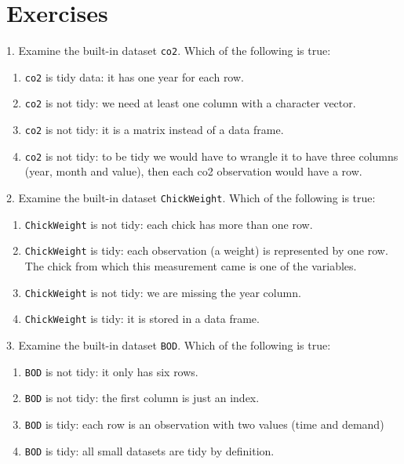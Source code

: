 \documentclass[
]{krantz}
\providecommand{\tightlist}{%
  \setlength{\itemsep}{0pt}\setlength{\parskip}{0pt}}
\begin{document}
\hypertarget{exercises-8}{%
\section{Exercises}\label{exercises-8}}

1. Examine the built-in dataset \texttt{co2}. Which of the following is true:

\begin{enumerate}
\def\labelenumi{\alph{enumi}.}
\tightlist
\item
  \texttt{co2} is tidy data: it has one year for each row.
\item
  \texttt{co2} is not tidy: we need at least one column with a character vector.
\item
  \texttt{co2} is not tidy: it is a matrix instead of a data frame.
\item
  \texttt{co2} is not tidy: to be tidy we would have to wrangle it to have three columns (year, month and value), then each co2 observation would have a row.
\end{enumerate}

2. Examine the built-in dataset \texttt{ChickWeight}. Which of the following is true:

\begin{enumerate}
\def\labelenumi{\alph{enumi}.}
\tightlist
\item
  \texttt{ChickWeight} is not tidy: each chick has more than one row.
\item
  \texttt{ChickWeight} is tidy: each observation (a weight) is represented by one row. The chick from which this measurement came is one of the variables.
\item
  \texttt{ChickWeight} is not tidy: we are missing the year column.
\item
  \texttt{ChickWeight} is tidy: it is stored in a data frame.
\end{enumerate}

3. Examine the built-in dataset \texttt{BOD}. Which of the following is true:

\begin{enumerate}
\def\labelenumi{\alph{enumi}.}
\tightlist
\item
  \texttt{BOD} is not tidy: it only has six rows.
\item
  \texttt{BOD} is not tidy: the first column is just an index.
\item
  \texttt{BOD} is tidy: each row is an observation with two values (time and demand)
\item
  \texttt{BOD} is tidy: all small datasets are tidy by definition.
\end{enumerate}
\end{document}
